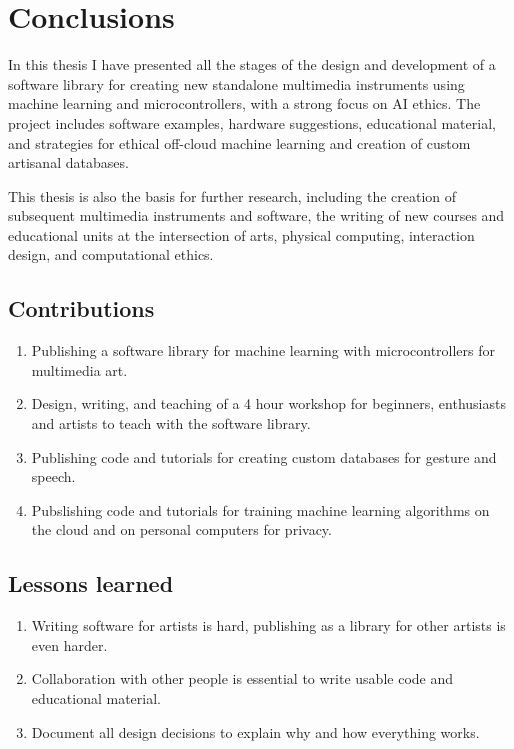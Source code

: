 \chapter{Conclusions}

In this thesis I have presented all the stages of the design and development of a software library for creating new standalone multimedia instruments using machine learning and microcontrollers, with a strong focus on AI ethics. The project includes software examples, hardware suggestions, educational material, and strategies for ethical off-cloud machine learning and creation of custom artisanal databases.

This thesis is also the basis for further research, including the creation of subsequent multimedia instruments and software, the writing of new courses and educational units at the intersection of arts, physical computing, interaction design, and computational ethics.

\section{Contributions}

\begin{enumerate}
  \item Publishing a software library for machine learning with microcontrollers for multimedia art.
  \item Design, writing, and teaching of a 4 hour workshop for beginners, enthusiasts and artists to teach with the software library.
  \item Publishing code and tutorials for creating custom databases for gesture and speech.
  \item Pubslishing code and tutorials for training machine learning algorithms on the cloud and on personal computers for privacy.
\end{enumerate}

\section{Lessons learned}

\begin{enumerate}
  \item Writing software for artists is hard, publishing as a library for other artists is even harder.
  \item Collaboration with other people is essential to write usable code and educational material.
  \item Document all design decisions to explain why and how everything works.
\end{enumerate}

